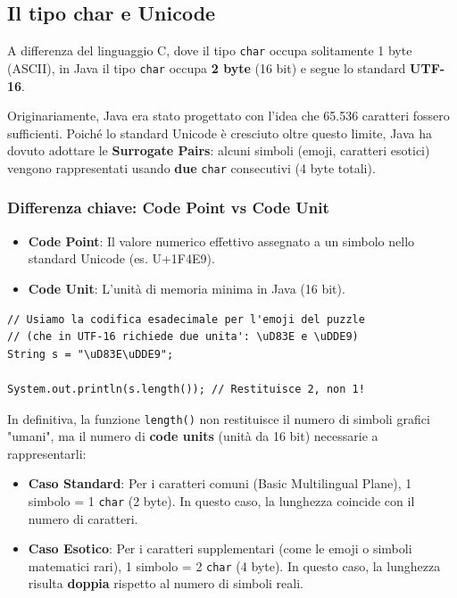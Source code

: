 \subsection{Il tipo char e Unicode}

A differenza del linguaggio C, dove il tipo \texttt{char} occupa solitamente 1 byte (ASCII), in Java il tipo \texttt{char} occupa \textbf{2 byte} (16 bit) e segue lo standard \textbf{UTF-16}.

\begin{observation}
Originariamente, Java era stato progettato con l'idea che 65.536 caratteri fossero sufficienti. Poiché lo standard Unicode è cresciuto oltre questo limite, Java ha dovuto adottare le \textbf{Surrogate Pairs}: alcuni simboli (emoji, caratteri esotici) vengono rappresentati usando \textbf{due} \texttt{char} consecutivi (4 byte totali).
\end{observation}

\subsubsection*{Differenza chiave: Code Point vs Code Unit}
\begin{itemize}
    \item \textbf{Code Point}: Il valore numerico effettivo assegnato a un simbolo nello standard Unicode (es. U+1F4E9).
    \item \textbf{Code Unit}: L'unità di memoria minima in Java (16 bit).
\end{itemize}

\begin{lstlisting}[caption={Esempio di conteggio con caratteri supplementari}]
// Usiamo la codifica esadecimale per l'emoji del puzzle 
// (che in UTF-16 richiede due unita': \uD83E e \uDDE9)
String s = "\uD83E\uDDE9"; 

System.out.println(s.length()); // Restituisce 2, non 1!
\end{lstlisting}

In definitiva, la funzione \texttt{length()} non restituisce il numero di simboli grafici "umani", ma il numero di \textbf{code units} (unità da 16 bit) necessarie a rappresentarli:
\begin{itemize}
    \item \textbf{Caso Standard}: Per i caratteri comuni (Basic Multilingual Plane), 1 simbolo = 1 \texttt{char} (2 byte). In questo caso, la lunghezza coincide con il numero di caratteri.
    \item \textbf{Caso Esotico}: Per i caratteri supplementari (come le emoji o simboli matematici rari), 1 simbolo = 2 \texttt{char} (4 byte). In questo caso, la lunghezza risulta \textbf{doppia} rispetto al numero di simboli reali.
\end{itemize}

